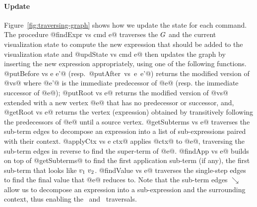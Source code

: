 \paragraph{Update}
Figure~\ref{fig:traversing-graph} shows how we update the state
for each command.
%
The procedure @findExpr vs cmd e@ traverses the $G$
and the current visualization state to compute the new
expression that should be added to the visualization state
and @updState vs cmd e@ then updates the graph
by inserting the new expression appropriately, using one of
the following functions.
%
@putBefore vs e e'@ \hbox{(resp. @putAfter vs e e'@)}
returns the modified version of @vs@ where @e'@ is the
immediate predecessor of @e@ (resp. the immediate successor of @e@);
%
@putRoot vs e@ returns the modified version of @vs@ extended
with a new vertex @e@ that has no predecessor or successor, and,
%
@getRoot vs e@ returns the vertex (expression) obtained
by transitively following the predecessors of @e@ until a
source vertex.
%
@getSubterms vs e@ traverses the sub-term edges to decompose an
expression into a list of sub-expressions paired with their context.
%
@applyCtx vs e ctx@ applies @ctx@ to @e@, traversing the sub-term edges
in reverse to find the super-term of @e@.
%
@findApp vs e@ builds on top of @getSubterms@ to find the first
application sub-term (if any), \ie the first sub-term that looks like
$v_1 \ v_2$.
%
@findValue vs e@ traverses the single-step edges to find the final value
that @e@ reduces to.
%
Note that the sub-term edges $\searrow$ allow us to decompose an
expression into a sub-expression and the surrounding context, thus
enabling the \stepintosym\ and \stepoversym\ traversals.


%
%
%
